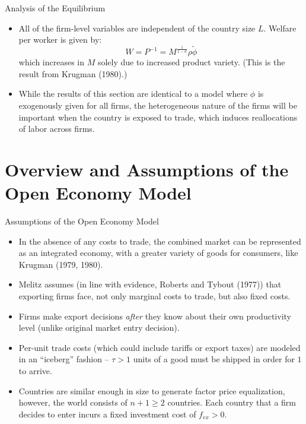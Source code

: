 \documentclass[aspectratio=169]{beamer}
\begin{document}

\begin{frame}{Analysis of the Equilibrium}

\begin{itemize}
    \item<1-> All of the firm-level variables are independent of the country size $ L $.  Welfare per worker is given by:
    \begin{equation*}
        W = P^{-1} = M^{\frac{1}{1 - \sigma}} \rho \tilde{\phi}
    \end{equation*}
    which increases in $ M $ solely due to increased product variety.  (This is the result from Krugman (1980).)
    \item<2->  While the results of this section are identical to a model where $ \phi $ is exogenously given for all firms, the heterogeneous nature of the firms will be important when the country is exposed to trade, which induces reallocations of labor across firms.  
\end{itemize}
    
\end{frame}


\section{Overview and Assumptions of the Open Economy Model}


\begin{frame}{Assumptions of the Open Economy Model}

\begin{itemize}
    \item<1->  In the absence of any costs to trade, the combined market can be represented as an integrated economy, with a greater variety of goods for consumers, like Krugman (1979, 1980).
    \item<2->  Melitz assumes (in line with evidence, Roberts and Tybout (1977)) that exporting firms face, not only marginal costs to trade, but also fixed costs.
    \item<3-> Firms make export decisions \emph{after} they know about their own productivity level (unlike original market entry decision).
    \item<4-> Per-unit trade costs (which could include tariffs or export taxes) are modeled in an “iceberg” fashion – $ \tau > 1 $ units of a good must be shipped in order for $ 1 $ to arrive.
    \item<5-> Countries are similar enough in size to generate factor price equalization, however, the world consists of $ n + 1 \ge 2 $ countries.  Each country that a firm decides to enter incurs a fixed investment cost of $ f_{ex} > 0 $.
\end{itemize}
    
\end{frame}
\end{document}
